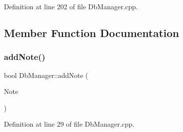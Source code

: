 Definition at line 202 of file Db\+Manager.\+cpp.



\subsection{Member Function Documentation}
\hypertarget{classDbManager_a0d97afdec08f212ec39100d26d8b4273}{}\label{classDbManager_a0d97afdec08f212ec39100d26d8b4273} 
\subsubsection{\texorpdfstring{add\+Note()}{addNote()}}
{\footnotesize\ttfamily bool Db\+Manager\+::add\+Note (\begin{DoxyParamCaption}\item[{\hyperlink{classMattyNote}{Matty\+Note} $\ast$}]{Note }\end{DoxyParamCaption})\hspace{0.3cm}{\ttfamily [static]}}



Definition at line 29 of file Db\+Manager.\+cpp.

